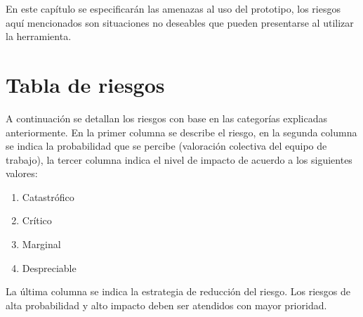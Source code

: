 En este capítulo se especificarán las amenazas al uso del prototipo, los riesgos aquí mencionados son situaciones no deseables
que pueden presentarse al utilizar la herramienta.


\section{Tabla de riesgos}
A continuación se detallan los riesgos con base en las categorías explicadas anteriormente.
En la primer columna se describe el riesgo, en la segunda columna se indica la 
probabilidad que se percibe (valoración colectiva del equipo de trabajo), la tercer columna indica el nivel de impacto de acuerdo a los siguientes valores:

\begin{enumerate}
 \item Catastrófico
 \item Crítico
 \item Marginal 
 \item Despreciable
\end{enumerate}

La última columna se indica la estrategia de reducción del riesgo. Los riesgos de alta probabilidad y alto impacto deben ser atendidos con mayor prioridad.\\

